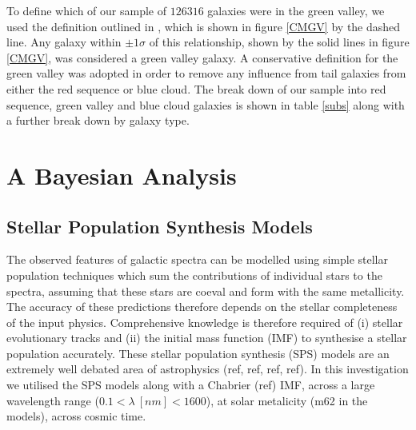 \documentclass{mn2e}
\begin{document}
To define which of our sample of $126316$ galaxies were in the green valley, we used the definition outlined in \citet{Baldry}, which is shown in figure \ref{CMGV} by the dashed line. Any galaxy within $\pm 1\sigma$ of this relationship, shown by the solid lines in figure \ref{CMGV}, was considered a green valley galaxy. A conservative definition for the green valley was adopted in order to remove any influence from tail galaxies from either the red sequence or blue cloud. The break down of our sample into red sequence, green valley and blue cloud galaxies is shown in table \ref{subs} along with a further break down by galaxy type. 


\section{A Bayesian Analysis}\label{models}
\subsection{Stellar Population Synthesis Models}\label{SPS}
The observed features of galactic spectra can be modelled using simple stellar population techniques which sum the contributions of individual stars to the spectra, assuming that these stars are coeval and form with the same metallicity. The accuracy of these predictions therefore depends on the stellar completeness of the input physics. Comprehensive knowledge is therefore required of (i) stellar evolutionary tracks and (ii) the initial mass function (IMF) to synthesise a stellar population accurately. These stellar population synthesis (SPS) models are an extremely well debated area of astrophysics (ref, ref, ref, ref). In this investigation we utilised the \citet{BC03} SPS models along with a Chabrier (ref) IMF, across a large wavelength range ($0.1 < \lambda ~[nm] < 1600$), at solar metalicity (m62 in the \citet{BC03} models), across cosmic time. 
\end{document}
